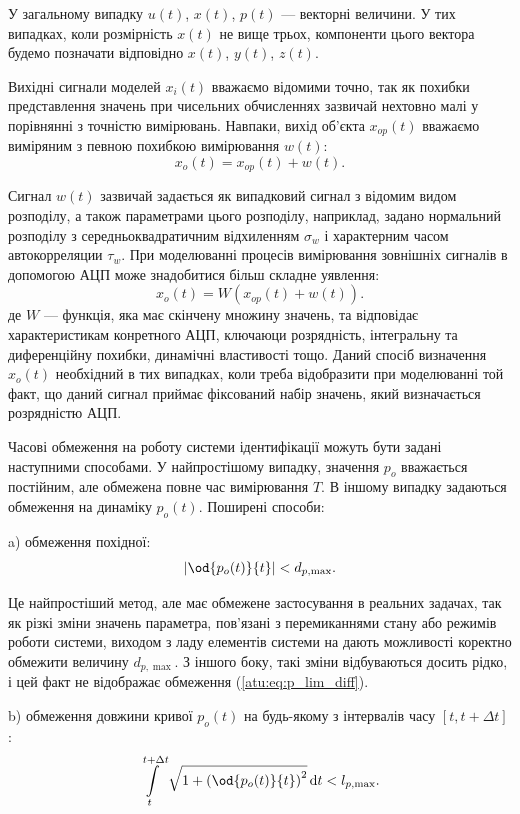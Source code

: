 У загальному випадку
$u(t)$,
$x(t)$,
$p(t)$ --- векторні величини. У тих випадках, коли розмірність
$x(t)$ не вище трьох, компоненти цього вектора будемо позначати
відповідно
$x(t) $,
$y(t) $,
$z(t) $.

Вихідні сигнали моделей \label{atu:d:x}$ x_i (t) $ вважаємо відомими точно,
так як похибки представлення значень при чисельних обчисленнях зазвичай нехтовно малі у порівнянні з
точністю вимірювань. Навпаки, вихід об'єкта
$x_{op}(t) $ вважаємо виміряним з певною похибкою вимірювання
\label{atu:d:w}
$ w (t) $:
%
\[
  x_o(t) = x_{op}(t) + w(t).
\]

Сигнал
$w(t) $ зазвичай задається як випадковий сигнал з відомим видом
розподілу, а також параметрами цього розподілу, наприклад,
задано нормальний розподілу з середньоквадратичним відхиленням
$ \sigma_w $ і характерним часом автокорреляции
$ \tau_w $. При моделюванні процесів вимірювання зовнішніх сигналів
в допомогою АЦП може знадобитися більш складне уявлення:
%
\[
  x_o(t) = W( x_{op}(t) + w(t) ).
\]
%
де
$W$ --- функція, яка має скінчену множину значень, та відповідає
характеристикам конретного АЦП, ключаюци розрядність,
інтегральну та диференційну похибки, динамічні властивості тощо.
Даний спосіб визначення
$ x_o (t) $ необхідний в тих випадках, коли треба відобразити при
моделюванні той факт, що даний сигнал приймає фіксований набір
значень, який визначається розрядністю АЦП.

Часові обмеження на роботу системи ідентифікації можуть бути
задані наступними способами. У найпростішому випадку, значення
$p_o$ вважається постійним, але обмежена повне час вимірювання
$ T $. В іншому випадку задаються обмеження на динаміку
$ p_o (t) $. Поширені способи:

a) обмеження похідної:
%
\begin{equation}
  \left| \od{p_o(t)}{t} \right| < d_{p,\max}.
  \label{atu:eq:p_lim_diff}
\end{equation}

Це найпростіший метод, але має обмежене застосування в реальних
задачах, так як різкі зміни значень параметра, пов'язані з
перемиканнями стану або режимів роботи системи, виходом з
ладу елементів системи на дають можливості коректно обмежити
величину
$ d_{p, \max} $. З іншого боку, такі зміни відбуваються досить рідко,
і цей факт не відображає обмеження (\ref{atu:eq:p_lim_diff}).

b) обмеження довжини кривої
$ p_o (t) $ на будь-якому з інтервалів часу
$ [t, t + \Delta t] $:
\begin{equation}
  \int\limits_{t}^{t+\Delta t} \sqrt{1 + \left( \od{p_o(t)}{t} \right)^2 } \, \mathrm{d}t < l_{p,\max}.
  \label{atu:eq:p_lim_l}
\end{equation}

